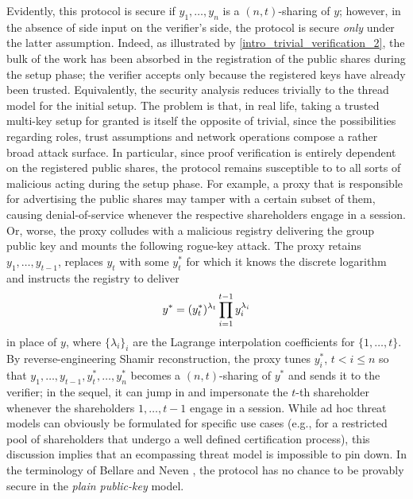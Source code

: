 \documentclass[psamsfonts, reqno]{amsart}
\theoremstyle{definition}
\theoremstyle{remark}
\numberwithin{equation}{section}
\begin{document}
Evidently, this protocol is secure
if $y_1, \dots, y_n$ is a $(n, t)$-sharing of $y$;
however, in the absence of side input
on the verifier's side,
the protocol is secure \textit{only} under the latter assumption.
Indeed, as illustrated by \eqref{intro_trivial_verification_2},
the bulk of the work has been
absorbed in the registration of the public shares
during the setup phase; the verifier accepts only because
the registered keys have already been trusted.
Equivalently, the security analysis
reduces trivially to the thread model for the initial setup.
The problem is that, in real life,
taking a trusted multi-key setup for granted
is itself the opposite of trivial,
since the possibilities regarding roles,
trust assumptions and network operations
compose a rather broad attack surface.
In particular,
since proof verification is entirely dependent
on the registered public shares, the protocol
remains susceptible to to all sorts of malicious acting
during the setup phase.
For example, a proxy that is responsible
for advertising the public shares
may tamper with a certain subset of them,
causing denial-of-service whenever
the respective shareholders engage
in a session.
Or, worse, the proxy colludes with
a malicious registry delivering the group public key
and mounts the following rogue-key attack.
The proxy retains $y_1, \dots, y_{t-1}$, replaces
$y_t$ with some $y_t^*$ for which it knows the discrete logarithm
and instructs the registry to deliver
\vspace{5pt}
\begin{equation*}
y^* = (y_t^*)^{\lambda_t}\prod_{i=1}^{t-1}y_i^{\lambda_i}
\vspace{5pt}
\end{equation*}
in place of $y$, where $\{\lambda_i\}_{i}$
are the Lagrange interpolation coefficients for $\{1, \dots, t\}$.
By reverse-engineering Shamir reconstruction,
the proxy tunes $y_i^*$, $t < i \le n$
so that $y_1, \dots, y_{t-1}, y_t^*, \dots, y_n^*$
becomes a $(n, t)$-sharing of $y^*$
and sends it to the verifier;
in the sequel, it can jump in and
impersonate the $t$-th shareholder
whenever the shareholders $1, \dots, t-1$ engage
in a session.
While ad hoc threat models can obviously be formulated
for specific use cases (e.g., for a restricted pool of
shareholders that undergo a well defined certification process),
this discussion implies that
an ecompassing threat model is impossible to pin down.
In the terminology of Bellare and Neven \cite{paper_bellare_musig},
the protocol has no chance to be provably secure
in the \textit{plain public-key} model.
\end{document}
